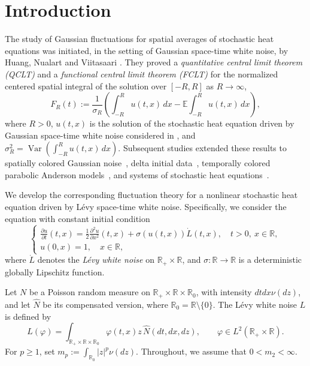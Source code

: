 \documentclass[12pt]{article}
\def\bE{\mathbb{E}}
\def\bR{\mathbb{R}}
\begin{document}
\section{Introduction}
The study of Gaussian fluctuations for spatial averages of stochastic heat
equations was initiated, in the setting of Gaussian space-time white noise, by
Huang, Nualart and Viitasaari \cite{HNV20}. They proved
a {\em quantitative central limit theorem (QCLT)} and a {\em functional central limit theorem (FCLT)} for the
normalized centered spatial integral of the solution
over $[-R,R]$ as $R\to\infty$,
\begin{equation}
\label{FR-old}
 F_R(t)
:=
\frac{1}{\sigma_R}
\left(
\int_{-R}^{R} u(t,x)\,dx
-
\bE\int_{-R}^{R} u(t,x)\,dx
\right),
\end{equation}
where $R>0$,  $u(t,x)$ is the solution of the stochastic heat equation driven by Gaussian space-time white noise considered in \cite{HNV20}, and $\sigma_R^2
=
\operatorname{Var}
\left(
\int_{-R}^{R} u(t,x)\,dx
\right)$. Subsequent studies extended these results to spatially colored Gaussian
noise~\cite{HNVZ20}, delta initial
data~\cite{KNP21}, temporally colored parabolic Anderson
models~\cite{NXZ22}, and systems of stochastic heat
equations~\cite{NS24}.


\medskip


We develop the corresponding fluctuation theory for a nonlinear stochastic heat equation driven by L\'evy space-time white noise. Specifically, we consider the equation with
constant initial condition
\begin{equation}
\label{nonlinear}
\begin{cases}
\displaystyle
\frac{\partial u}{\partial t}(t,x)
=
\frac{1}{2}\frac{\partial^2 u}{\partial x^2}(t,x)
+\sigma(u(t,x))\dot L(t,x),
\quad t>0,\ x\in\bR,\\[0.3em]
u(0,x)=1,\quad x\in\bR,
\end{cases}
\end{equation}
where $\dot L$ denotes the {\em L\'evy white noise} on
$\bR_+\times\bR$, and $\sigma:\bR\to\bR$ is a deterministic globally
Lipschitz function.


\medskip


 Let $N$ be a Poisson random measure on
$\bR_+\times\bR\times\bR_0$, with intensity $dtdx\nu(dz)$, and let
$\widehat N$ be its compensated version, where $\bR_0=\bR\setminus\{0\}$.
The L\'evy white noise $L$ is defined by
\begin{equation}
\label{def-L}
L(\varphi)
=
\int_{\bR_+\times\bR\times\bR_0}
\varphi(t,x)z\,
\widehat N(dt,dx,dz),
\qquad
\varphi\in L^2(\bR_+\times\bR).
\end{equation}
 For $p\ge1$, set $m_p:=\int_{\bR_0}|z|^p\nu(dz)$. Throughout, we
assume that $0<m_2<\infty$.
\end{document}
